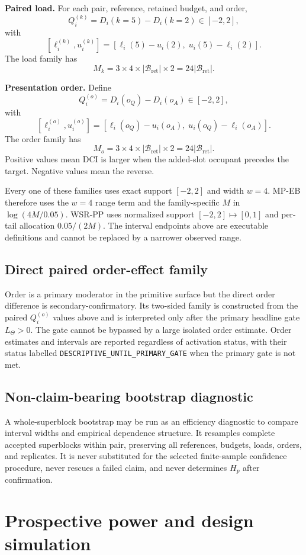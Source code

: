 \documentclass[11pt,a4paper]{article}
\newcommand{\Bret}{\mathcal B_{\mathrm{ret}}}
\begin{document}
\textbf{Paired load.} For each pair, reference, retained budget, and order,
\[
Q_i^{(k)}=D_i(k=5)-D_i(k=2)\in[-2,2],
\]
with
\[
[\ell_i^{(k)},u_i^{(k)}]
=
[\ell_i(5)-u_i(2),\;u_i(5)-\ell_i(2)].
\]
The load family has
\[
M_k=3\times4\times|\Bret|\times2=24|\Bret|.
\]

\textbf{Presentation order.} Define
\[
Q_i^{(o)}=D_i(o_Q)-D_i(o_A)\in[-2,2],
\]
with
\[
[\ell_i^{(o)},u_i^{(o)}]
=
[\ell_i(o_Q)-u_i(o_A),\;u_i(o_Q)-\ell_i(o_A)].
\]
The order family has
\[
M_o=3\times4\times|\Bret|\times2=24|\Bret|.
\]
Positive values mean DCI is larger when the added-slot occupant precedes the target. Negative values mean the reverse.

Every one of these families uses exact support $[-2,2]$ and width $w=4$. MP-EB therefore uses the $w=4$ range term and the family-specific $M$ in $\log(4M/0.05)$. WSR-PP uses normalized support $[-2,2]\mapsto[0,1]$ and per-tail allocation $0.05/(2M)$. The interval endpoints above are executable definitions and cannot be replaced by a narrower observed range.

\subsection{Direct paired order-effect family}\label{sec:orderfamily}
Order is a primary moderator in the primitive surface but the direct order difference is secondary-confirmatory. Its two-sided family is constructed from the paired $Q_i^{(o)}$ values above and is interpreted only after the primary headline gate $L_\Theta>0$. The gate cannot be bypassed by a large isolated order estimate. Order estimates and intervals are reported regardless of activation status, with their status labelled \texttt{DESCRIPTIVE\_UNTIL\_PRIMARY\_GATE} when the primary gate is not met.

\subsection{Non-claim-bearing bootstrap diagnostic}
A whole-superblock bootstrap may be run as an efficiency diagnostic to compare interval widths and empirical dependence structure. It resamples complete accepted superblocks within pair, preserving all references, budgets, loads, orders, and replicates. It is never substituted for the selected finite-sample confidence procedure, never rescues a failed claim, and never determines $H_p$ after confirmation.

\section{Prospective power and design simulation}\label{sec:power}
\end{document}
